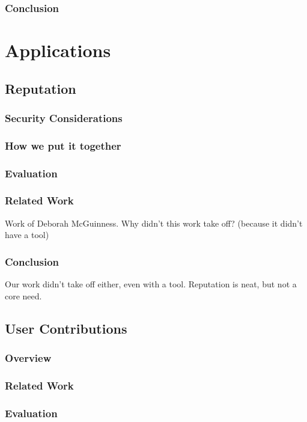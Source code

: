     \section{Conclusion}

\part{Applications}

\chapter{Reputation}
    \section{Security Considerations}
    \section{How we put it together}
    \section{Evaluation}
    \section{Related Work}
        Work of Deborah McGuinness.  Why didn't this work take off?
        (because it didn't have a tool)
    \section{Conclusion}
        Our work didn't take off either, even with a tool.
        Reputation is neat, but not a core need.

\chapter{User Contributions}

    \section{Overview}
    \section{Related Work}
    \section{Evaluation}
